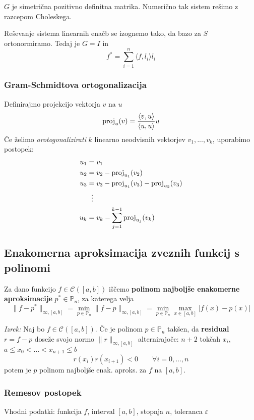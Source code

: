 \begin{multicols}{5}
$G$ je simetrična pozitivno definitna matrika. Numerično tak sistem rešimo z razcepom Choleskega.


Reševanje sistema linearnih enačb se izognemo tako, da bazo za $S$ ortonormiramo. Tedaj je $G = I$ in
\[ f^* = \sum_{i=1}^n \langle f, l_i \rangle l_i \]

\subsubsection*{Gram-Schmidtova ortogonalizacija}
Definirajmo projekcijo vektorja $v$ na $u$
\[\textmd{proj}_u(v) = \frac{\langle v,u \rangle}{\langle u,u \rangle}u\]
Če želimo \emph{orotogonalizirati} $k$ linearno neodvisnih vektorjev $v_1, ..., v_k$, uporabimo postopek:
\begin{equation*}
    \begin{aligned}
    u_1 &= v_1 \\
    u_2 &= v_2 - \textmd{proj}_{u_1}(v_2) \\
    u_3 &= v_3 - \textmd{proj}_{u_1}(v_3) - \textmd{proj}_{u_2}(v_3) \\
    &\; \ \vdots \\
    u_k &= v_k - \sum_{j=1}^{k-1} \textmd{proj}_{u_j}(v_k)
    \end{aligned}
\end{equation*}


\subsection*{Enakomerna aproksimacija zveznih funkcij s polinomi}
Za dano funkcijo $f \in \mathcal{C}([a,b])$ iščemo \textbf{polinom najboljše enakomerne aproksimacije} $p^* \in \mathbb{P}_n$, za katerega velja
\[ \| f - p^* \|_{\infty, [a,b]} = \min_{p \in \mathbb{P}_n} \| f - p\|_{\infty, [a,b]} = \min_{p \in \mathbb{P}_n} \max_{x \in [a, b]} | f(x) - p(x) | \]

\textit{Izrek:} Naj bo $f \in \mathcal{C}([a, b])$. Če je polinom $p \in \mathbb{P}_n$ takšen,
da \textbf{residual} $r = f - p$ doseže svojo normo $\| r \|_{\infty, [a,b]}$ alternirajoče:
$n+2$ tokčah $x_i$, $a \leq x_0 < \dots < x_{n+1} \leq b$ 
\[ r(x_i)r(x_{i+1}) < 0 \qquad \forall i=0, \dots, n \]
potem je $p$ polinom najboljše enak. aproks. za $f$ na $[a, b]$.

\subsubsection*{Remesov postopek}
Vhodni podatki: funkcija $f$, interval $[a,b]$, stopnja $n$, toleranca $\varepsilon$


\end{multicols}
